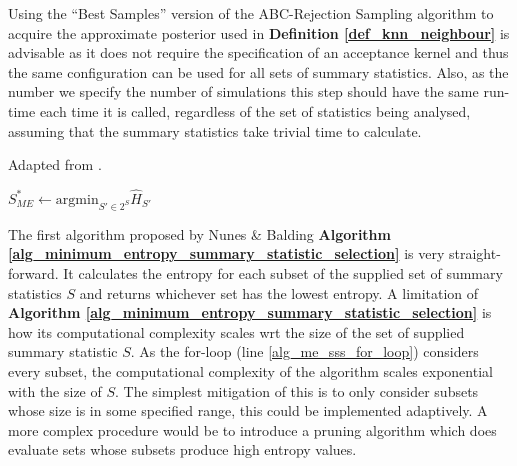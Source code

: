 \documentclass[11pt,a4paper]{article}
\theoremstyle{break}
\begin{document}
  \par Using the ``Best Samples'' version of the ABC-Rejection Sampling algorithm to acquire the approximate posterior used in \textbf{Definition \ref{def_knn_neighbour}} is advisable as it does not require the specification of an acceptance kernel and thus the same configuration can be used for all sets of summary statistics. Also, as the number we specify the number of simulations this step should have the same run-time each time it is called, regardless of the set of statistics being analysed, assuming that the summary statistics take trivial time to calculate.

  \begin{box_algorithm}\label{alg_minimum_entropy_summary_statistic_selection}
    Adapted from \cite[]{on_optimal_selection_of_summary_stats_for_ABC}.
    \par
    \begin{algorithm}[H]
      $S_{ME}^*\leftarrow\text{argmin}_{S'\in 2^S}\hat{H}_{S'}$\\
    \end{algorithm}
  \end{box_algorithm}

  \par The first algorithm proposed by Nunes \& Balding \textbf{Algorithm \ref{alg_minimum_entropy_summary_statistic_selection}} is very straight-forward. It calculates the entropy for each subset of the supplied set of summary statistics $S$ and returns whichever set has the lowest entropy. A limitation of \textbf{Algorithm \ref{alg_minimum_entropy_summary_statistic_selection}} is how its computational complexity scales wrt the size of the set of supplied summary statistic $S$. As the for-loop (line \ref{alg_me_sss_for_loop}) considers every subset, the computational complexity of the algorithm scales exponential with the size of $S$. The simplest mitigation of this is to only consider subsets whose size is in some specified range, this could be implemented adaptively. A more complex procedure would be to introduce a pruning algorithm which does evaluate sets whose subsets produce high entropy values.
\end{document}
